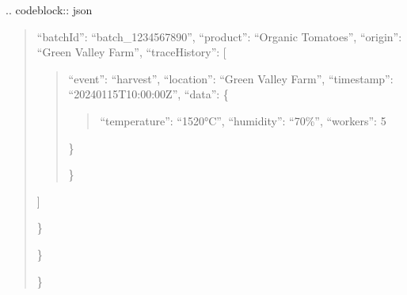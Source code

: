 \documentclass[letterpaper,10pt,english]{sphinxmanual}
\begin{document}
\sphinxAtStartPar
{}
.. code\sphinxhyphen{}block:: json
\begin{quote}
\begin{description}
\sphinxlineitem{\{}\begin{description}
\begin{description}
\sphinxAtStartPar
“batchId”: “batch\_1234567890”,
“product”: “Organic Tomatoes”,
“origin”: “Green Valley Farm”,
“traceHistory”: {[}
\begin{quote}
\begin{description}
\sphinxlineitem{\{}
\sphinxAtStartPar
“event”: “harvest”,
“location”: “Green Valley Farm”,
“timestamp”: “2024\sphinxhyphen{}01\sphinxhyphen{}15T10:00:00Z”,
“data”: \{
\begin{quote}

\sphinxAtStartPar
“temperature”: “15\sphinxhyphen{}20°C”,
“humidity”: “70\%”,
“workers”: 5
\end{quote}

\sphinxAtStartPar
\}

\end{description}

\sphinxAtStartPar
\}
\end{quote}

\sphinxAtStartPar
{]}

\end{description}

\sphinxAtStartPar
\}

\end{description}

\sphinxAtStartPar
\}

\end{description}

\sphinxAtStartPar
\}
\end{quote}
\end{document}
